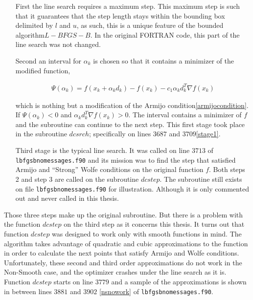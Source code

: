 \begin{enumerate}
\item[First] the line search requires a maximum step. This maximum step is such that it guarantees that the step length stays within the bounding box delimited by $l$ and $u$, as such, this is a unique feature of the bounded algorithm$L-BFGS-B$. In the original \textsc{FORTRAN} code, this part of the line search was not changed.

\item[Second] an interval for $\alpha_k$ is chosen so that it contains a minimizer of the modified function,

\begin{equation} \label{armijomod}
  \begin{aligned}
    \Psi(\alpha_k) = f(x_k + \alpha_k d_k) - f(x_k) - c_1 \alpha_k d_k^T  \nabla f(x_k)
  \end{aligned}
\end{equation} 

 which is nothing but a modification of the Armijo condition\ref{armijocondition}. If $\Psi(\alpha_k) < 0$ and $\alpha_k d_k^T \nabla f(x_k) > 0$. The interval contains a minimizer of $f$ and the subroutine can continue to the next step. This first stage took place in the subroutine $dcsrch$; specifically on lines $3687$ and $3709$\ref{stage1}.

\item[Third] stage is the typical line search\citep{nocedal}. It was called on line $3713$ of \texttt{lbfgsbnomessages.f90} and its mission was to find the step that satisfied Armijo and ``Strong'' Wolfe conditions on the original function $f$. Both steps 2 and step 3 are called on the subroutine $dcstep$. The subroutine still exists on file \texttt{lbfgsbnomessages.f90} for illustration. Although it is only commented out and never called in this thesis.

\end{enumerate}

Those three steps make up the original subroutine. But there is a problem with the function $dcstep$ on the third step as it concerns this thesis. It turns out that function $dcstep$ was designed to work only with smooth functions in mind. The algorithm takes advantage of quadratic and cubic approximations to the function in order to calculate the next points that satisfy Armijo and Wolfe conditions. Unfortunately, these second and third order approximations do not work in the Non-Smooth case, and the optimizer crashes under the line search as it is. Function $dcstep$ starts on line $3779$ and a sample of the approximations is shown in between lines $3881$ and $3902$ \ref{nsnowork} of \texttt{lbfgsbnomessages.f90}.

